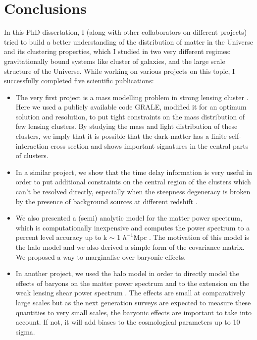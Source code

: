 \chapter{Conclusions}\label{conclusions}


In this PhD dissertation, I (along with other collaborators on different projects) tried
to build a better understanding of the distribution of 
matter in the Universe and its clustering properties, which I studied
in two very different regimes: gravitationally  bound systems like 
cluster of galaxies, and the large scale structure of the Universe. 
While working on various projects on this topic, I successfully
completed five scientific publications:

\begin{itemize}
\item	The very first project is a mass modelling problem in strong lensing cluster
	\cite{2014MNRAS.439.2651M}. Here we
	used a publicly available code GRALE, modified it for an optimum solution and resolution,
	to put tight constraints on the mass distribution of few lensing clusters. By studying
	the mass and light distribution of these clusters, we imply that it is possible 
	that the dark-matter has a finite self-interaction cross section and shows
	important signatures in the central parts of clusters. 

\item	In a similar project, we show that the time delay information is very useful in 
	order to put additional constraints on the central region of the clusters which can't 
	be resolved directly, especially when the steepness degeneracy is broken by the 
	presence of background sources at different redshift \cite{2015PASJ...67...21M}.

\item	We also presented a (semi) analytic model for the matter power spectrum, which is
	computationally inexpensive and computes the power spectrum to a percent level 
	accuracy up to k $\sim$ 1 $h^{-1}\mathrm{Mpc}$ \cite{2014MNRAS.445.3382M}. 
	The motivation of this model is the halo model
	and we also derived a simple form of the covariance matrix. We proposed a way to 
	marginalise over baryonic effects. 

\item	In another project, we used the halo model in order to directly
	model the effects of baryons on the matter power spectrum and to the extension on the
	weak lensing shear power spectrum \cite{2014arXiv1410.6826M}. 
	The effects are small at comparatively large
	scales but as the next generation surveys are expected to measure these quantities 
	to very small scales, the baryonic effects are important to take into account. If not, 
	it will add biases to the cosmological parameters up to 10 sigma. 


\end{itemize}
